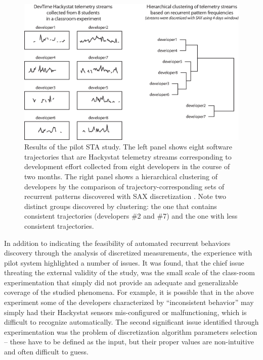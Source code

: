 \begin{figure}[t]
   \centering
   \includegraphics[width=145mm]{figures/STA1.eps}
   \caption{Results of the pilot STA study. 
   The left panel shows eight software trajectories that are Hackystat telemetry streams 
   corresponding to development effort \cite{citeulike:557296} collected from eight developers in the course of two months.
   The right panel shows a hierarchical clustering of developers by the comparison of trajectory-corresponding sets of 
   recurrent patterns discovered with SAX discretization \cite{sax}. 
   Note two distinct groups discovered by clustering: the one that contains consistent trajectories (developers \#2 and \#7) 
   and the one with less consistent trajectories.}
   \label{fig:STA1-results}
\end{figure}

In addition to indicating the feasibility of automated recurrent behaviors discovery through the analysis of discretized measurements, the experience with pilot system highlighted a number of issues. It was found, that the chief issue threating the external validity of the study, was the small scale of the class-room experimentation that simply did not provide an adequate and generalizable coverage of the studied phenomena. For example, it is possible that in the above experiment some of the developers characterized by ``inconsistent behavior'' may simply had their Hackystat sensors mis-configured or malfunctioning, which is difficult to recognize automatically. The second significant issue identified through experimentation was the problem of discretization algorithm parameters selection -- these have to be defined as the input, but their proper values are non-intuitive and often difficult to guess.

